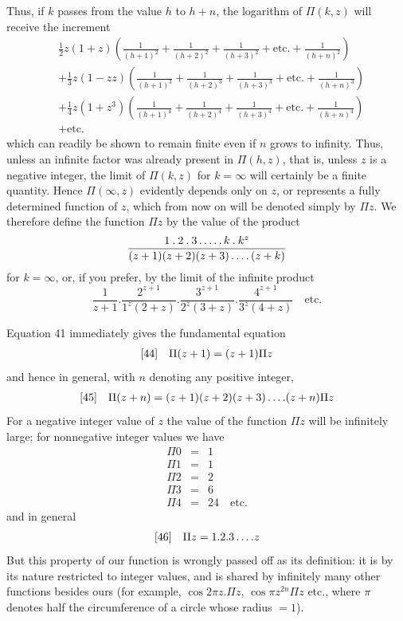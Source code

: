 Thus, if $k$ passes from the value $h$ to $h+n$, the logarithm of $\Pi(k,z)$ will receive the increment
\[
\begin{aligned}
&\tfrac12 z(1+z)\left(\frac1{(h+1)^2}+\frac1{(h+2)^2}+\frac1{(h+3)^2}+\text{etc.}+\frac1{(h+n)^2}\right)\\[5pt]
&+\tfrac13 z(1-zz)\left(\frac1{(h+1)^3}+\frac1{(h+2)^3}+\frac1{(h+3)^3}+\text{etc.}+\frac1{(h+n)^3}\right)\\[5pt]
&+\tfrac14 z(1+z^3)\left(\frac1{(h+1)^4}+\frac1{(h+2)^4}+\frac1{(h+3)^4}+\text{etc.}+\frac1{(h+n)^4}\right)\\[5pt]
&+\text{etc.}
\end{aligned}
\]
which can readily be shown to remain finite even if $n$ grows to infinity. Thus, unless an infinite factor was already present in $\Pi(h,z)$, that is, unless $z$ is a negative integer, the limit of $\Pi(k,z)$ for $k=\infty$ will certainly be a finite quantity. Hence $\Pi(\infty,z)$ evidently depends only on $z$, or represents a fully determined function of $z$, which from now on will be denoted simply by $\Pi z$. We therefore define the function $\Pi z$ by the value of the product
\[
\frac{1\mathbin{.}2\mathbin{.}3\mathinner{.\,.\,.\,.\,.}k\mathbin{.}k^z}{(z+1)(z+2)(z+3)\mathinner{.\,.\,.\,.}(z+k)}
\]
for $k=\infty$, or, if you prefer, by the limit of the infinite product
\[
\frac{1}{z+1}.\frac{2^{z+1}}{1^z(2+z)}.
\frac{3^{z+1}}{2^z(3+z)}.\frac{4^{z+1}}{3^z(4+z)}\quad\mathrm{etc.}
\]

Equation 41 immediately gives the fundamental equation
\[
\begin{array}{@{}ll@{}}
[44]&\displaystyle\Pi(z+1)=(z+1)\Pi z
\end{array}
\]
and hence in general, with $n$ denoting any positive integer,
\[
\begin{array}{@{}ll@{}}
[45]&\displaystyle\Pi(z+n)=(z+1)(z+2)(z+3)\,.\,.\,.\,.(z+n)\Pi z
\end{array}
\]
For a negative integer value of $z$ the value of the function $\Pi z$ will be infinitely large; for nonnegative integer values we have
\[
\begin{array}{rcl}
\Pi0&=&1\\
\Pi1&=&1\\
\Pi2&=&2\\
\Pi3&=&6\\
\Pi4&=&24\quad\mathrm{etc.}
\end{array}
\]
and in general
\[
\begin{array}{@{}ll@{}}
[46]&\displaystyle\Pi z=1.2.3\,.\,.\,.\,.z
\end{array}
\]
But this property of our function is wrongly passed off as its definition: it is by its nature restricted to integer values, and is shared by infinitely many other functions besides ours (for example, $\cos2\pi z.\Pi z$, $\cos\pi z^{2n}\Pi z$ etc., where $\pi$ denotes half the circumference of a circle whose radius $=1$).

